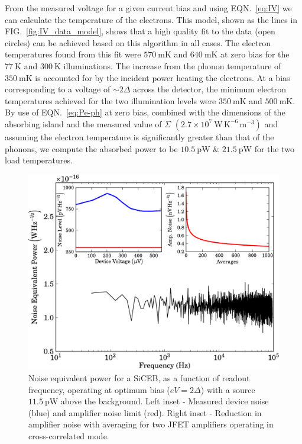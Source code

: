 \documentclass[aip, apl, a4paper, amsmath,amssymb, reprint]{revtex4-1}
\begin{document}
From the measured voltage for a given current bias and using EQN.~\ref{eq:IV} we can calculate the temperature of the electrons. This model, shown as the lines in FIG.~\ref{fig:IV_data_model}, shows that a high quality fit to the data (open circles) can be achieved based on this algorithm in all cases. The electron temperatures found from this fit were $570~\mathrm{mK}$ and $640~\mathrm{mK}$ at zero bias for the $77~\mathrm{K}$ and $300~\mathrm{K}$ illuminations. The increase from the phonon temperature of $350~\mathrm{mK}$ is accounted for by the incident power heating the electrons. At a bias corresponding to a voltage of $\sim 2\Delta$ across the detector, the minimum electron temperatures achieved for the two illumination levels were $350~\mathrm{mK}$ and $500~\mathrm{mK}$. By use of EQN.~\ref{eq:Pe-ph} at zero bias, combined with the dimensions of the absorbing island and the measured value of $\Sigma$ $(2.7 \times 10^{7}~\mathrm{W\,K^{-6}\,m^{-3}})$ and assuming the electron temperature is significantly greater than that of the phonons, we compute the absorbed power to be $10.5~\mathrm{pW}$ \& $21.5~\mathrm{pW}$ for the two load temperatures.
\begin{figure}[t]
\includegraphics[width = 0.8\columnwidth]{NEP_ampNoise_APL}
\caption{Noise equivalent power for a SiCEB, as a function of readout frequency, operating at optimum bias ($eV=2\Delta$) with a source $11.5~\mathrm{pW}$ above the background. Left inset - Measured device noise (blue) and amplifier noise limit (red). Right inset - Reduction in amplifier noise with averaging for two JFET amplifiers operating in cross-correlated mode.}
\label{fig:NEP_ampNoise}
\end{figure}
\end{document}
